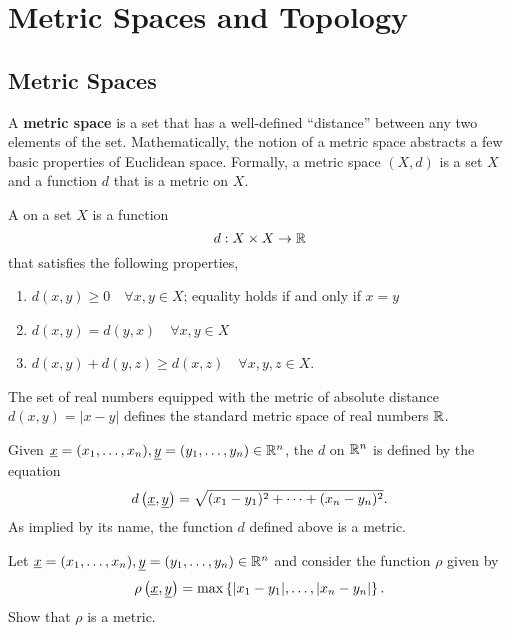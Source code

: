\chapter{Metric Spaces and Topology}

\section{Metric Spaces}

A \textbf{metric space} is a set that has a well-defined ``distance'' between any two elements of the set.
Mathematically, the notion of a metric space abstracts a few basic properties of Euclidean space.
Formally, a metric space $(X,d)$ is a set $X$ and a function $d$ that is a metric on $X$.
\begin{definition}
A  on a set $X$ is a function
\begin{equation*}
d: X \times X \rightarrow \mathbb{R}
\end{equation*}
that satisfies the following properties,
\begin{enumerate}
\item $d(x,y) \geq 0 \quad \forall x, y \in X$; equality holds if and only if $x = y$
\item $d(x,y) = d(y,x) \quad \forall x, y \in X$
\item $d(x,y) + d(y,z) \geq d(x,z) \quad \forall x, y, z \in X$.
\end{enumerate}
\end{definition}

\begin{example}
The set of real numbers equipped with the metric of absolute distance $d(x,y)=\left| x-y \right|$ defines the standard metric space of real numbers $\mathbb{R}$.
\end{example}

\begin{example}
Given $\underline{x} = (x_1, \ldots, x_n), \underline{y} = (y_1, \ldots, y_n) \in \mathbb{R}^n$, the  $d$ on $\mathbb{R}^n$ is defined by the equation
\begin{equation*}
d \left( \underline{x}, \underline{y} \right)
= \sqrt{ (x_1 - y_1)^2 + \cdots + (x_n - y_n)^2 }.
\end{equation*}
As implied by its name, the function $d$ defined above is a metric.
\end{example}

\begin{problem}
Let $\underline{x} = (x_1, \ldots, x_n), \underline{y} = (y_1, \ldots, y_n) \in \mathbb{R}^n$ and consider the function $\rho$ given by
\begin{equation*}
\rho \left( \underline{x}, \underline{y} \right)
= \max \left\{ |x_1 - y_1|, \ldots, |x_n - y_n| \right\}.
\end{equation*}
Show that $\rho$ is a metric.
\end{problem}

